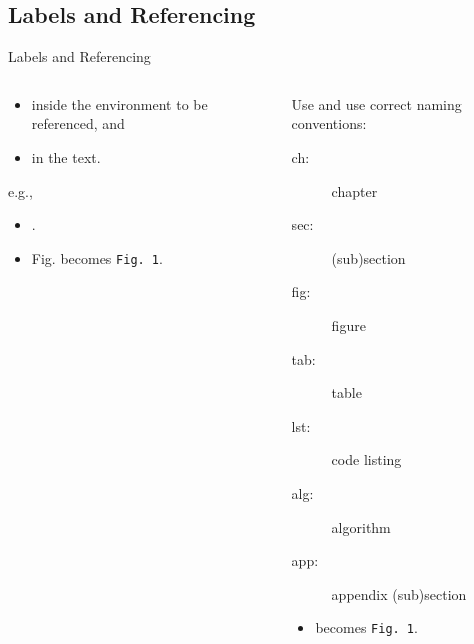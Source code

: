 \subsection{Labels and Referencing}

\begin{frame}[fragile]{Labels and Referencing}
    \noindent

    \begin{columns}[t]
		\begin{column}{.5\textwidth}
            \begin{itemize}
                \item[]   inside the environment to be referenced, and
                \item[]  in the text.
            \end{itemize}     
            e.g., 
            \begin{itemize}
                \item[] .
                \item[] Fig.\texttildelow {} becomes \texttt{Fig.~1}.
            \end{itemize}
		\end{column}
		\begin{column}{.5\textwidth}
			Use  and use correct naming conventions:
            \begin{description}
                \item[ch:] chapter
                \item[sec:] (sub)section 
                \item[fig:] figure
                \item[tab:] table
                \item[lst:] code listing
                \item[alg:] algorithm
                \item[app:] appendix (sub)section
            \end{description}
            \begin{itemize}
                \item[]  becomes \texttt{Fig.~1}.
            \end{itemize}
		\end{column}
    \end{columns}
\end{frame}

